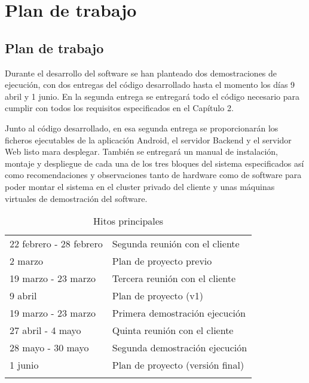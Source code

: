 
\chapter{Plan de trabajo} %

\label{Chapter4} %


\section{Plan de trabajo}

Durante el desarrollo del software se han planteado dos demostraciones de ejecuci\'on, con dos entregas del c\'odigo desarrollado hasta el momento los d\'ias 9 abril y 1 junio. En la segunda entrega se entregar\'a todo el c\'odigo necesario para cumplir con todos los requisitos especificados en el Cap\'itulo 2.

Junto al c\'odigo desarrollado, en esa segunda entrega se proporcionar\'an los ficheros ejecutables de la aplicaci\'on Android, el servidor Backend y el servidor Web listo mara desplegar. Tambi\'en se entregar\'a un manual de instalaci\'on, montaje y despliegue de cada una de los tres bloques del sistema especificados así como recomendaciones y observaciones tanto de hardware como de software para poder montar el sistema en el cluster privado del cliente y unas máquinas virtuales de demostración del software.

\begin{table}[htbp]
	\caption{Hitos principales}
	\label{tab:milestones}
	\centering
	\begin{tabular}{l p{4in}}
		\toprule
		\tabhead{Fecha} & \tabhead{Entrega} \\
		\midrule
		22 febrero - 28 febrero & Segunda reuni\'on con el cliente\\
		2 marzo & Plan de proyecto previo\\

		19 marzo - 23 marzo & Tercera reuni\'on con el cliente\\

		9 abril & Plan de proyecto (v1)\\
		19 marzo - 23 marzo & Primera demostraci\'on ejecuci\'on\\
		
		27 abril - 4 mayo & Quinta reuni\'on con el cliente\\
		
		28 mayo - 30 mayo & Segunda demostraci\'on ejecuci\'on\\
		1 junio & Plan de proyecto (versi\'on final)\\

		\bottomrule\\
	\end{tabular}
\end{table}
